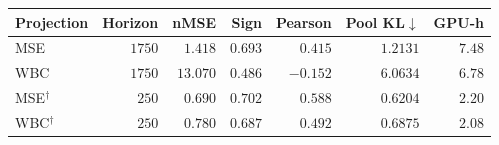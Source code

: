 \begin{tabular}{lrrrrrr}
\toprule
Projection & Horizon & nMSE & Sign & Pearson & Pool KL$\downarrow$ & GPU-h\\
\midrule
MSE & $1750$ & $1.418$ & $0.693$ & $0.415$ & $1.2131$ & $7.48$\\
WBC & $1750$ & $13.070$ & $0.486$ & $-0.152$ & $6.0634$ & $6.78$\\
MSE$^\dagger$ & $250$ & $0.690$ & $0.702$ & $0.588$ & $0.6204$ & $2.20$\\
WBC$^\dagger$ & $250$ & $0.780$ & $0.687$ & $0.492$ & $0.6875$ & $2.08$\\
\bottomrule
\end{tabular}
